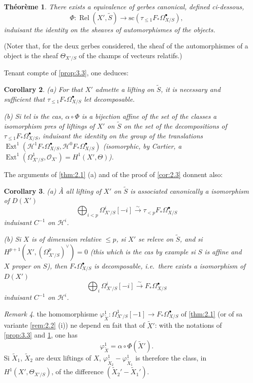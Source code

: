 \documentclass[12pt,a4paper]{article}
\theoremstyle{plain}
\newtheorem{theorem}{Th\'eor\`eme}[section]
\newtheorem{corollary}[theorem]{Corollary}
\theoremstyle{definition}
\theoremstyle{remark}
\newtheorem{remark}[theorem]{Remark}
\DeclareMathOperator{\Ext}{Ext}
\DeclareMathOperator{\Rel}{Rel}
\newcommand{\cO}{\mathcal{O}}
\begin{document}
\begin{theorem}\label{thm:3.5}
There exists a equivalence of gerbes canonical, defined ci-dessous,
\[
\Phi: \Rel(X', \tilde{S}) \to \mathrm{sc}(\tau_{\le 1} F_* \Omega^{\bullet}_{X/S}),
\]
induisant the identity on the sheaves of automorphismes of the objects.
\end{theorem}

(Noter that, for the deux gerbes considered, the sheaf of the automorphismes of a object is the sheaf $\Theta_{X'/S}$ of the champs of vecteurs relatifs.)

Tenant compte of \ref{prop:3.3}, one deduces:

\begin{corollary}\label{cor:3.6}
\textup{(a)} For that $X'$ admette a lifting on $\tilde{S}$, it is necessary and sufficient that $\tau_{\le 1} F_* \Omega^{\bullet}_{X/S}$ let decomposable.

\textup{(b)} Si tel is the cas, $\alpha \circ \Phi$ is a bijection affine of the set of the classes a isomorphism pres of liftings of $X'$ on $\tilde{S}$ on the set of the decompositions of $\tau_{\le 1} F_* \Omega^{\bullet}_{X/S}$, induisant the identity on the group of the translations $\Ext^1(\mathscr{H}^1 F_* \Omega^{\bullet}_{X/S}, \mathscr{H}^0 F_* \Omega^{\bullet}_{X/S})$ (isomorphic, by Cartier, a $\Ext^1(\Omega^1_{X'/S}, \cO_{X'}) = H^1(X', \Theta)$).
\end{corollary}

The arguments of \ref{thm:2.1} (a) and of the proof of \ref{cor:2.3} donnent also:

\begin{corollary}\label{cor:3.7}
\textup{(a)} \`A all lifting of $X'$ on $\tilde{S}$ is associated canonically a isomorphism of $D(X')$
\[
\bigoplus_{i < p} \Omega^i_{X'/S}[-i] \xrightarrow{\sim} \tau_{<p} F_* \Omega^{\bullet}_{X/S}
\]
induisant $C^{-1}$ on $\mathscr{H}^i$.

\textup{(b)} Si $X$ is of dimension relative $\le p$, si $X'$ se releve on $\tilde{S}$, and si $H^{p+1}(X', (\Omega^p_{X'/S})^\vee) = 0$ (this which is the cas by example si $S$ is affine and $X$ proper on $S$), then $F_* \Omega^{\bullet}_{X/S}$ is decomposable, i.e.~there exists a isomorphism of $D(X')$
\[
\bigoplus_i \Omega^i_{X'/S}[-i] \xrightarrow{\sim} F_* \Omega^{\bullet}_{X/S}
\]
induisant $C^{-1}$ on $\mathscr{H}^i$.
\end{corollary}

\begin{remark}\label{rem:3.8}
the homomorphisme $\varphi^1_{\tilde{X}}: \Omega^1_{X'/S}[-1] \to F_* \Omega^{\bullet}_{X/S}$ of \ref{thm:2.1} (or of sa variante \ref{rem:2.2} (i)) ne depend en fait that of $\tilde{X}'$: with the notations of \ref{prop:3.3} and \ref{thm:3.5}, one has
\[
\varphi^1_{\tilde{X}} = \alpha \circ \Phi(\tilde{X}').
\]
Si $\tilde{X}_1$, $\tilde{X}_2$ are deux liftings of $X$, $\varphi^1_{\tilde{X}_2} - \varphi^1_{\tilde{X}_1}$ is therefore the class, in $H^1(X', \Theta_{X'/S})$, of the difference $(\tilde{X}_2' - \tilde{X}_1')$.
\end{remark}
\end{document}
